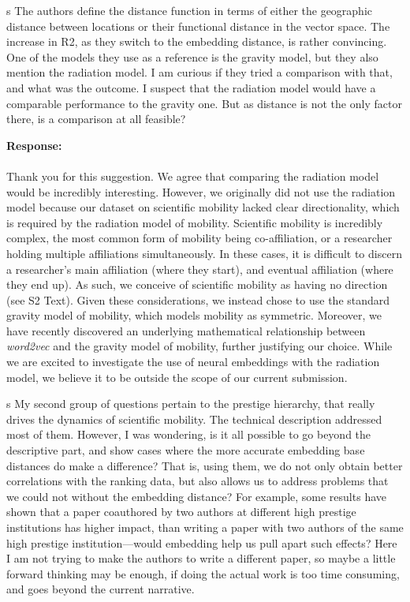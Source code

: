 \documentclass[12pt,a4paper]{article}
\newcounter{comment}[subsection]
\newcommand{\response}[1]{{\noindent \textbf{Response:} \\ \\ \noindent #1}}
\newcommand{\rcomment}[1]{%
\vspace{10pt}
\begin{sectionbox}
s #1
\end{sectionbox}
}
\begin{document}
\rcomment{
	The authors define the distance function in terms of either the geographic distance between locations or their functional distance in the vector space. The increase in R2, as they switch to the embedding distance, is rather convincing. One of the models they use as a reference is the gravity model, but they also mention the radiation model. I am curious if they tried a comparison with that, and what was the outcome. I suspect that the radiation model would have a comparable performance to the gravity one. But as distance is not the only factor there, is a comparison at all feasible?
}

\response{Thank you for this suggestion.
	We agree that comparing the radiation model would be incredibly interesting.
	However, we originally did not use the radiation model because our dataset on scientific mobility lacked clear directionality, which is required by the radiation model of mobility.
	Scientific mobility is incredibly complex, the most common form of mobility being co-affiliation, or a researcher holding multiple affiliations simultaneously.
	In these cases, it is difficult to discern a researcher's main affiliation (where they start), and eventual affiliation (where they end up).
	As such, we conceive of scientific mobility as having no direction (see S2 Text).
	Given these considerations, we instead chose to use the standard gravity model of mobility, which models mobility as symmetric.
	Moreover, we have recently discovered an underlying mathematical relationship between \textit{word2vec} and the gravity model of mobility, further justifying our choice.
	While we are excited to investigate the use of neural embeddings with the radiation model, we believe it to be outside the scope of our current submission.
}

\rcomment{
	My second group of questions pertain to the prestige hierarchy, that really drives the dynamics of scientific mobility. The technical description addressed most of them. However, I was wondering, is it all possible to go beyond the descriptive part, and show cases where the more accurate embedding base distances do make a difference? That is, using them, we do not only obtain better correlations with the ranking data, but also allows us to address problems that we could not without the embedding distance? For example, some results have shown that a paper coauthored by two authors at different high prestige institutions has higher impact, than writing a paper with two authors of the same high prestige institution—would embedding help us pull apart such effects? Here I am not trying to make the authors to write a different paper, so maybe a little forward thinking may be enough, if doing the actual work is too time consuming, and goes beyond the current narrative.
}
\end{document}
